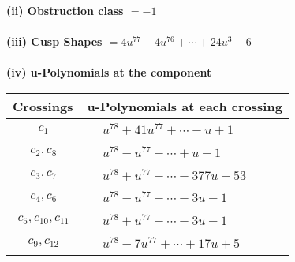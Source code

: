\documentclass[1p]{elsarticle_modified}
\theoremstyle{definition}
\begin{document}
\flushleft \textbf{(ii) Obstruction class $= -1$}\\~\\
\flushleft \textbf{(iii) Cusp Shapes $= 4 u^{77}-4 u^{76}+\cdots+24 u^3-6$}\\~\\
\newpage\renewcommand{\arraystretch}{1}
\flushleft \textbf{(iv) u-Polynomials at the component}\newline \\
\begin{tabular}{m{50pt}|m{274pt}}
Crossings & \hspace{64pt}u-Polynomials at each crossing \\
\hline $$\begin{aligned}c_{1}\end{aligned}$$&$\begin{aligned}
&u^{78}+41 u^{77}+\cdots- u+1
\end{aligned}$\\
\hline $$\begin{aligned}c_{2},c_{8}\end{aligned}$$&$\begin{aligned}
&u^{78}- u^{77}+\cdots+u-1
\end{aligned}$\\
\hline $$\begin{aligned}c_{3},c_{7}\end{aligned}$$&$\begin{aligned}
&u^{78}+u^{77}+\cdots-377 u-53
\end{aligned}$\\
\hline $$\begin{aligned}c_{4},c_{6}\end{aligned}$$&$\begin{aligned}
&u^{78}- u^{77}+\cdots-3 u-1
\end{aligned}$\\
\hline $$\begin{aligned}c_{5},c_{10},c_{11}\end{aligned}$$&$\begin{aligned}
&u^{78}+u^{77}+\cdots-3 u-1
\end{aligned}$\\
\hline $$\begin{aligned}c_{9},c_{12}\end{aligned}$$&$\begin{aligned}
&u^{78}-7 u^{77}+\cdots+17 u+5
\end{aligned}$\\
\hline
\end{tabular}\\~\\
\end{document}
